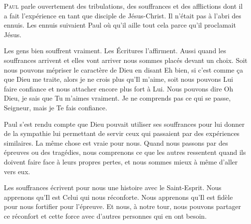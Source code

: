\lettrine{P}{aul} parle ouvertement des tribulations,
 des souffrances et des afflictions dont il a fait
 l'expérience en tant que disciple de Jésus-Christ.
 Il n'était pas à l'abri des ennuis.
 Les ennuis suivaient Paul où qu'il aille
 \ocadr tout cela parce qu'il proclamait Jésus.


Les \Og gens bien \Fg{} souffrent vraiment.
 Les Écritures l'affirment.
 Aussi quand les souf\-fran\-ces arrivent
 \ocadr et elles vont arriver \fcadr{}
 nous sommes placés devant un choix.
 Soit nous pouvons mépriser le caractère de Dieu
 en disant\frcolon{} 
 \Og Eh bien, si c'est comme \c{c}a que Dieu me traite,
 alors je ne crois plus qu'Il m'aime, \Fg{}
 soit nous pouvons Lui faire confiance et nous attacher
 encore plus fort à Lui.
 Nous pouvons dire\frcolon{} 
 \Og Oh Dieu, je sais que Tu m'aimes vraiment.
 Je ne comprends pas ce qui se passe, Seigneur,
 mais je Te fais confiance. \Fg{}

Paul s'est rendu compte que Dieu pouvait utiliser
 ses souffrances pour lui donner de la sympathie
 lui permettant de servir ceux qui passaient
 par des expériences similaires.
 La même chose est vraie pour nous.
 Quand nous passons par des épreuves ou des tragédies,
 nous comprenons ce que les autres ressentent
 quand ils doivent faire face à leurs propres pertes,
 et nous sommes mieux à même d'aller vers eux.

Les souffrances écrivent pour nous une histoire
 avec le Saint-Esprit.
 Nous apprenons qu'Il est Celui qui nous réconforte.
 Nous apprenons qu'Il est fidèle pour nous fortifier pour l'épreuve.
 Et nous, à notre tour, nous pouvons partager ce réconfort
 et cette force avec d'autres personnes qui en ont besoin.

\dvrule







